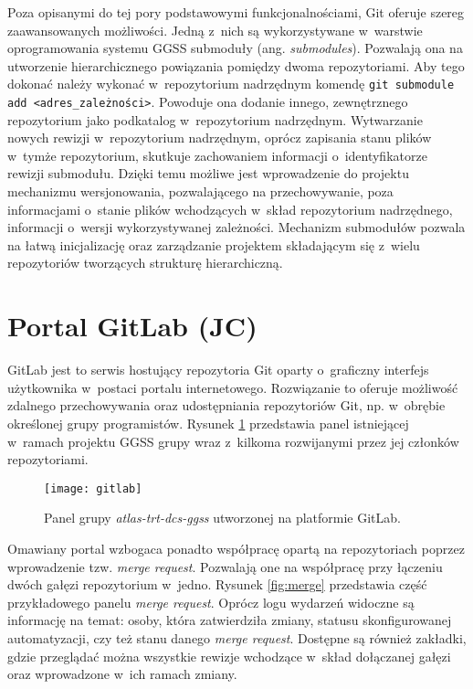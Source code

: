 Poza opisanymi do tej pory podstawowymi funkcjonalnościami, Git oferuje szereg zaawansowanych możliwości. Jedną z~nich są wykorzystywane w~warstwie oprogramowania systemu GGSS submoduły (ang. \emph{submodules}). Pozwalają ona na utworzenie hierarchicznego powiązania pomiędzy dwoma repozytoriami. Aby tego dokonać należy wykonać w~repozytorium nadrzędnym komendę \lstinline{git submodule add <adres_zależności>}. Powoduje ona dodanie innego, zewnętrznego repozytorium jako podkatalog w~repozytorium nadrzędnym. Wytwarzanie nowych rewizji w~repozytorium nadrzędnym, oprócz zapisania stanu plików w~tymże repozytorium, skutkuje zachowaniem informacji o~identyfikatorze rewizji submodułu. Dzięki temu możliwe jest wprowadzenie do projektu mechanizmu wersjonowania, pozwalającego na przechowywanie, poza informacjami o~stanie plików wchodzących w~skład repozytorium nadrzędnego, informacji o~wersji wykorzystywanej zależności. Mechanizm submodułów pozwala na łatwą inicjalizację oraz zarządzanie projektem składającym się z~wielu repozytoriów tworzących strukturę hierarchiczną. 


\section{Portal GitLab (JC)}

GitLab jest to serwis hostujący repozytoria Git oparty o~graficzny interfejs użytkownika w~postaci portalu internetowego. Rozwiązanie to oferuje możliwość zdalnego przechowywania oraz udostępniania repozytoriów Git, np. w~obrębie określonej grupy programistów. Rysunek \ref{fig:gitlab} przedstawia panel istniejącej w~ramach projektu GGSS grupy wraz z~kilkoma rozwijanymi przez jej członków repozytoriami.

\begin{figure}[H]
    \centering
    \texttt{[image: gitlab]}
    \caption{Panel grupy \emph{atlas-trt-dcs-ggss} utworzonej na platformie GitLab.}
    \label{fig:gitlab}
\end{figure}

Omawiany portal wzbogaca ponadto współpracę opartą na repozytoriach poprzez wprowadzenie tzw. \emph{merge request}. Pozwalają one na współpracę przy łączeniu dwóch gałęzi repozytorium w~jedno. Rysunek \ref{fig:merge} przedstawia część przykładowego panelu \emph{merge request}. Oprócz logu wydarzeń widoczne są informację na temat: osoby, która zatwierdziła zmiany, statusu skonfigurowanej automatyzacji, czy też stanu danego \emph{merge request}. Dostępne są również zakładki, gdzie przeglądać można wszystkie rewizje wchodzące w~skład dołączanej gałęzi oraz wprowadzone w~ich ramach zmiany.

